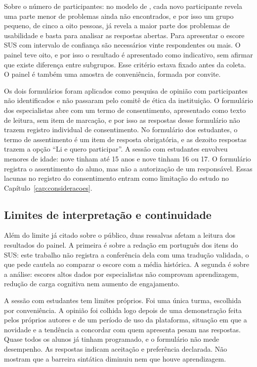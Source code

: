 Sobre o número de participantes: no modelo de , cada novo participante revela uma parte menor de problemas ainda não encontrados, e por isso um grupo pequeno, de cinco a oito pessoas, já revela a maior parte dos problemas de usabilidade e basta para analisar as respostas abertas. Para apresentar o escore SUS com intervalo de confiança são necessários vinte respondentes ou mais. O painel teve oito, e por isso o resultado é apresentado como indicativo, sem afirmar que existe diferença entre subgrupos. Esse critério estava fixado antes da coleta. O painel é também uma amostra de conveniência, formada por convite.

Os dois formulários foram aplicados como pesquisa de opinião com participantes não identificados e não passaram pelo comitê de ética da instituição. O formulário dos especialistas abre com um termo de consentimento, apresentado como texto de leitura, sem item de marcação, e por isso as respostas desse formulário não trazem registro individual de consentimento. No formulário dos estudantes, o termo de assentimento é um item de resposta obrigatória, e as dezoito respostas trazem a opção ``Li e quero participar''. A sessão com estudantes envolveu menores de idade: nove tinham até 15 anos e nove tinham 16 ou 17. O formulário registra o assentimento do aluno, mas não a autorização de um responsável. Essas lacunas no registro do consentimento entram como limitação do estudo no Capítulo~\ref{cap:consideracoes}.

\subsection{Limites de interpretação e continuidade}
\label{subsec:limites-interpretacao}

Além do limite já citado sobre o público, duas ressalvas afetam a leitura dos resultados do painel. A primeira é sobre a redação em português dos itens do SUS: este trabalho não registra a conferência dela com uma tradução validada, o que pede cautela ao comparar o escore com a média histórica. A segunda é sobre a análise: escores altos dados por especialistas não comprovam aprendizagem, redução de carga cognitiva nem aumento de engajamento.

A sessão com estudantes tem limites próprios. Foi uma única turma, escolhida por conveniência. A opinião foi colhida logo depois de uma demonstração feita pelos próprios autores e de um período de uso da plataforma, situação em que a novidade e a tendência a concordar com quem apresenta pesam nas respostas. Quase todos os alunos já tinham programado, e o formulário não mede desempenho. As respostas indicam aceitação e preferência declarada. Não mostram que a barreira sintática diminuiu nem que houve aprendizagem.


